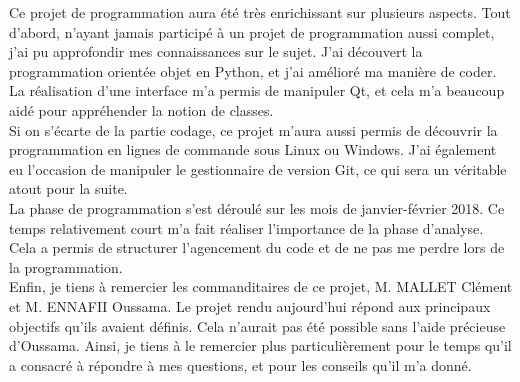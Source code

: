 \documentclass{themeensg}
\begin{document}
Ce projet de programmation aura été très enrichissant sur plusieurs aspects. Tout d'abord, n'ayant jamais participé à un projet de programmation aussi complet, j'ai pu approfondir mes connaissances sur le sujet. J'ai découvert la programmation orientée objet en Python, et j'ai amélioré ma manière de coder. La réalisation d'une interface m'a permis de manipuler Qt, et cela m'a beaucoup aidé pour appréhender la notion de classes. \\

Si on s'écarte de la partie codage, ce projet m'aura aussi permis de découvrir la programmation en lignes de commande sous Linux ou Windows. J'ai également eu l'occasion de manipuler le gestionnaire de version Git, ce qui sera un véritable atout pour la suite.\\

La phase de programmation s'est déroulé sur les mois de janvier-février 2018. Ce temps relativement court m'a fait réaliser l'importance de la phase d'analyse. Cela a permis de structurer l'agencement du code et de ne pas me perdre lors de la programmation.\\

Enfin, je tiens à remercier les commanditaires de ce projet, M. MALLET Clément et M. ENNAFII Oussama. Le projet rendu aujourd'hui répond aux principaux objectifs qu'ils avaient définis. Cela n'aurait pas été possible sans l'aide précieuse d'Oussama. Ainsi, je tiens à le remercier plus particulièrement pour le temps qu'il a consacré à répondre à mes questions, et pour les conseils qu'il m'a donné.\\

\newpage
\listoffigures

\end{document}
